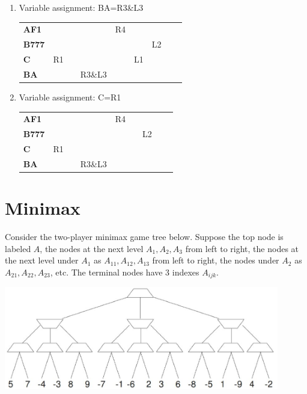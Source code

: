 \documentclass[11pt]{article}
\begin{document}
\begin{enumerate}
\begin{enumerate}
  \item Variable assignment:  BA=R3\&L3
\begin{center}\begin{tabular}{l|cccccccc|}
{\bf AF1}  & & & & R4 & & & & \\ 
{\bf B777} & & & & & & L2 & & \\ 
{\bf C}    & R1 & & & & L1 & & & \\ 
{\bf BA}   & & & R3\&L3 & &  &  &  &  \\ 
\end{tabular}\end{center}

  \item Variable assignment:  C=R1
\begin{center}\begin{tabular}{l|cccccccc|}
{\bf AF1}  & & & & R4 & & & & \\ 
{\bf B777} & & & & & & L2 & & \\ 
{\bf C}    & R1 & & & & & & & \\ 
{\bf BA}   & & & R3\&L3 & &  &  &  &  \\ 
\end{tabular}\end{center}

   \end{enumerate}

\end{enumerate}

\clearpage

\section{Minimax}

Consider the two-player minimax game tree below.  Suppose the top node
is labeled $A$, the nodes at the next level $A_1, A_2, A_3$ from left
to right, the nodes at the next level under $A_1$ as $A_{11}, A_{12},
A_{13}$ from left to right, the nodes under $A_2$ as $A_{21}, A_{22},
A_{23}$, etc.  The terminal nodes have 3 indexes $A_{ijk}$.

\centerline{\includegraphics[width=0.9\textwidth]{minimax.eps}}
\end{document}
